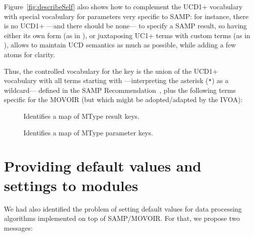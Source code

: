 		
		Figure~\ref{fig:describeSelf} also shows how to complement
		the UCD1+ vocabulary with special vocabulary for
		parameters very specific to SAMP: for instance, there is no
		UCD1+ ---and there should be none--- to specify a SAMP
		result, so having either its own form (as in
		), or juxtaposing UC1+ terms with
		custom terms (as in ), allows
		to maintain UCD semantics as much as possible, while adding
		a few atoms for clarity.
		
		Thus, the controlled vocabulary for the  key is
		the union of the UCD1+ vocabulary with all terms starting
		with  ---interpreting the asterisk
		(\texttt{*}) as a wildcard--- defined in the SAMP
		Recommendation~\cite{2009samp.ivoav0904T}, plus the
		following terms specific for the MOVOIR (but which might be
		adopted/adapted by the IVOA):
		
		\begin{description}
			\item[] Identifies a map of
			MType result keys.
			
			\item[] Identifies a map
			of MType parameter keys.
		\end{description}
		
		
	
	\section{Providing default values and settings to modules} %
	\label{sec:providing_default_values_settings}
		
		We had also identified the problem of setting default
		values for data processing algorithms implemented on
		top of SAMP/MOVOIR. For that, we propose two messages:
		
